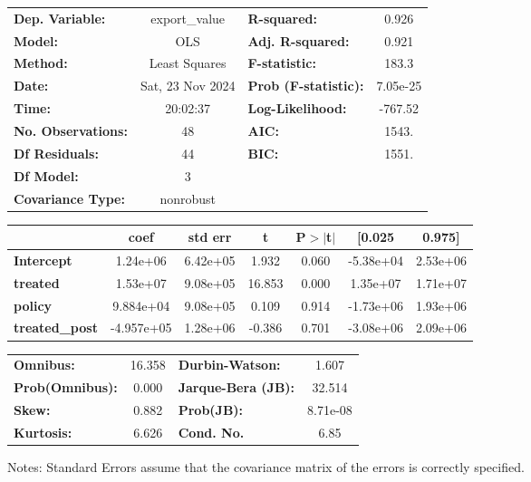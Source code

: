 \begin{center}
\begin{tabular}{lclc}
\toprule
\textbf{Dep. Variable:}    &  export\_value   & \textbf{  R-squared:         } &     0.926   \\
\textbf{Model:}            &       OLS        & \textbf{  Adj. R-squared:    } &     0.921   \\
\textbf{Method:}           &  Least Squares   & \textbf{  F-statistic:       } &     183.3   \\
\textbf{Date:}             & Sat, 23 Nov 2024 & \textbf{  Prob (F-statistic):} &  7.05e-25   \\
\textbf{Time:}             &     20:02:37     & \textbf{  Log-Likelihood:    } &   -767.52   \\
\textbf{No. Observations:} &          48      & \textbf{  AIC:               } &     1543.   \\
\textbf{Df Residuals:}     &          44      & \textbf{  BIC:               } &     1551.   \\
\textbf{Df Model:}         &           3      & \textbf{                     } &             \\
\textbf{Covariance Type:}  &    nonrobust     & \textbf{                     } &             \\
\bottomrule
\end{tabular}
\begin{tabular}{lcccccc}
                       & \textbf{coef} & \textbf{std err} & \textbf{t} & \textbf{P$> |$t$|$} & \textbf{[0.025} & \textbf{0.975]}  \\
\midrule
\textbf{Intercept}     &     1.24e+06  &     6.42e+05     &     1.932  &         0.060        &    -5.38e+04    &     2.53e+06     \\
\textbf{treated}       &     1.53e+07  &     9.08e+05     &    16.853  &         0.000        &     1.35e+07    &     1.71e+07     \\
\textbf{policy}        &    9.884e+04  &     9.08e+05     &     0.109  &         0.914        &    -1.73e+06    &     1.93e+06     \\
\textbf{treated\_post} &   -4.957e+05  &     1.28e+06     &    -0.386  &         0.701        &    -3.08e+06    &     2.09e+06     \\
\bottomrule
\end{tabular}
\begin{tabular}{lclc}
\textbf{Omnibus:}       & 16.358 & \textbf{  Durbin-Watson:     } &    1.607  \\
\textbf{Prob(Omnibus):} &  0.000 & \textbf{  Jarque-Bera (JB):  } &   32.514  \\
\textbf{Skew:}          &  0.882 & \textbf{  Prob(JB):          } & 8.71e-08  \\
\textbf{Kurtosis:}      &  6.626 & \textbf{  Cond. No.          } &     6.85  \\
\bottomrule
\end{tabular}
\end{center}

Notes: \newline
 [1] Standard Errors assume that the covariance matrix of the errors is correctly specified.